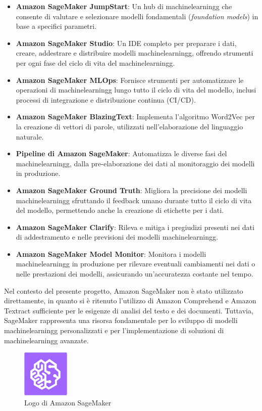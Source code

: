 \begin{itemize}
    \item \textbf{Amazon SageMaker JumpStart}: Un hub di \gls{machinelearningg} che consente di valutare e selezionare modelli fondamentali (\textit{foundation models}) in base a specifici parametri.
    \item \textbf{Amazon SageMaker Studio}: Un IDE completo per preparare i dati, creare, addestrare e distribuire modelli \gls{machinelearningg}, offrendo strumenti per ogni fase del ciclo di vita del \gls{machinelearningg}.
    \item \textbf{Amazon SageMaker MLOps}: Fornisce strumenti per automatizzare le operazioni di \gls{machinelearningg} lungo tutto il ciclo di vita del modello, inclusi processi di integrazione e distribuzione continua (CI/CD).
    \item \textbf{Amazon SageMaker BlazingText}: Implementa l'algoritmo Word2Vec per la creazione di vettori di parole, utilizzati nell'elaborazione del linguaggio naturale.
    \item \textbf{Pipeline di Amazon SageMaker}: Automatizza le diverse fasi del \gls{machinelearningg}, dalla pre-elaborazione dei dati al monitoraggio dei modelli in produzione.
    \item \textbf{Amazon SageMaker Ground Truth}: Migliora la precisione dei modelli \gls{machinelearningg} sfruttando il feedback umano durante tutto il ciclo di vita del modello, permettendo anche la creazione di etichette per i dati.
    \item \textbf{Amazon SageMaker Clarify}: Rileva e mitiga i pregiudizi presenti nei dati di addestramento e nelle previsioni dei modelli \gls{machinelearningg}.
    \item \textbf{Amazon SageMaker Model Monitor}: Monitora i modelli \gls{machinelearningg} in produzione per rilevare eventuali cambiamenti nei dati o nelle prestazioni dei modelli, assicurando un'accuratezza costante nel tempo.
\end{itemize}

Nel contesto del presente progetto, Amazon SageMaker non è stato utilizzato direttamente, in quanto si è ritenuto l'utilizzo di Amazon Comprehend e Amazon Textract sufficiente per le esigenze di analisi del testo e dei documenti. Tuttavia, SageMaker rappresenta una risorsa fondamentale per lo sviluppo di modelli \gls{machinelearningg} personalizzati e per l'implementazione di soluzioni di \gls{machinelearningg} avanzate.
\begin{figure}[h]
  \centering
  \includegraphics[width=0.2\textwidth]{img/tecnologie/sagemaker.png}
  \caption{Logo di Amazon SageMaker}
  \label{fig:sagemaker}
\end{figure}

